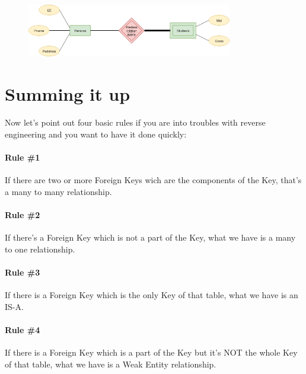 \documentclass[class=book, crop=false, oneside]{standalone}
\begin{document}
\begin{figure}[H]
	\includegraphics[width=0.8\textwidth,keepaspectratio]{diagram6_03.png}
	\label{diagram6_03}
\end{figure}

\section{Summing it up}
Now let's point out four basic rules if you are into troubles with reverse engineering and you want to have it done quickly:
\paragraph{Rule \#1} If there are two or more Foreign Keys wich are the components of the Key, that's a many to many relationship.
\paragraph{Rule \#2} If there's a Foreign Key which is not a part of the Key, what we have is a many to one relationship.
\paragraph{Rule \#3} If there is a Foreign Key which is the only Key of that table, what we have is an IS-A.
\paragraph{Rule \#4} If there is a Foreign Key which is a part of the Key but it's NOT the whole Key of that table, what we have is a Weak Entity relationship.
\end{document}
